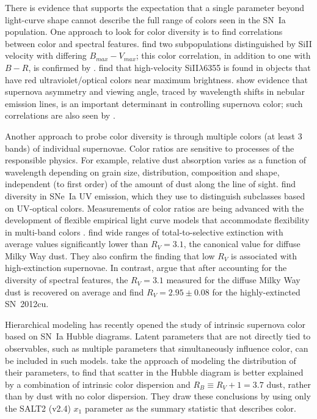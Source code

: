 \documentclass{aastex61}   	%
\begin{document}
There is evidence that supports the expectation that a single parameter beyond light-curve shape  cannot describe the full range
of colors seen in the SN~Ia population.  One approach to look for color diversity is to find correlations between color and spectral features.
\citet{2009ApJ...699L.139W, 2011ApJ...729...55F} find two subpopulations distinguished
by SiII velocity with differing $B_{max}-V_{max}$; this color correlation, in addition to one with $B-R$, is confirmed by
\citet{2014ApJ...797...75M}.
\citet{2015MNRAS.451.1973S}
find that high-velocity SiII$\lambda$6355 is found in objects that have red ultraviolet/optical colors near maximum brightness.
\citet{2011MNRAS.413.3075M} show evidence that supernova asymmetry and viewing angle,
traced by wavelength shifts in nebular emission lines, is an important determinant in controlling supernova color; such correlations are also seen by \citet{2011A&A...534L..15C}.

Another approach to probe color diversity is through multiple colors (at least 3 bands)
of individual supernovae.  Color ratios are sensitive to processes of the responsible physics.   For example,
relative dust absorption varies as a function of wavelength depending on grain size, distribution, composition and shape,
independent (to first order) of the amount of dust along the line of sight.
\citet{2013ApJ...779...23M} find diversity in SNe~Ia UV emission, which they use to distinguish subclasses based on UV-optical colors.
Measurements of color ratios are being advanced with the development of flexible empirical light curve models that accommodate flexibility in multi-band colors
\citep[e.g.][]{2011ApJ...731..120M}.
\citet{2014ApJ...789...32B, 2015MNRAS.453.3300A} find wide
ranges of total-to-selective extinction with average values significantly lower than $R_V = 3.1$,
the canonical value for diffuse Milky Way dust.
They also confirm the \citet{2011ApJ...731..120M, 2011ApJ...729...55F} finding that low $R_V$ is associated with high-extinction supernovae.
In contrast, \citet{2011A&A...529L...4C} argue that after accounting for the diversity of spectral features,
the $R_V=3.1$ measured for the diffuse Milky Way dust is recovered on average and \citet{2017arXiv170101422H}
find $R_V=2.95 \pm 0.08$ for the highly-extincted SN~2012cu.

Hierarchical modeling has recently opened
the study of intrinsic supernova color based on SN~Ia Hubble diagrams. Latent parameters that are not directly tied to observables,
such as multiple parameters that simultaneously influence color, can be included in such models.
\citet{2016arXiv160904470M} take the approach of modeling the distribution of their parameters, to find that
scatter in the Hubble diagram is better explained by a combination of intrinsic color dispersion and
$R_B \equiv R_V+1=3.7$ dust, rather than by dust with no color dispersion.
They draw these conclusions by using only the SALT2 (v2.4) $x_1$ parameter as the summary statistic that describes color.
\end{document}
